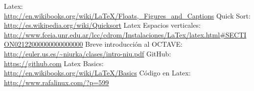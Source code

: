 \documentclass[a4,12pt]{article}
\begin{document}
\newpage
\begin{thebibliography}{99}
 Latex:\\ \url{http://en.wikibooks.org/wiki/LaTeX/Floats,_Figures_and_Captions}
 Quick Sort:\\ \url{http://es.wikipedia.org/wiki/Quicksort}
 Latex Espacios verticales: \\ \url{http://www.fceia.unr.edu.ar/lcc/cdrom/Instalaciones/LaTex/latex.html#SECTION02122000000000000000}
 Breve introducción al OCTAVE: \\ \url{http://euler.us.es/~niurka/clases/intro-niu.pdf}
 GitHub: \\ \url{https://github.com}
 Latex Basics: \\ \url{http://en.wikibooks.org/wiki/LaTeX/Basics}
 Código en Latex: \\ \url{http://www.rafalinux.com/?p=599}

\end{thebibliography}
\end{document}
